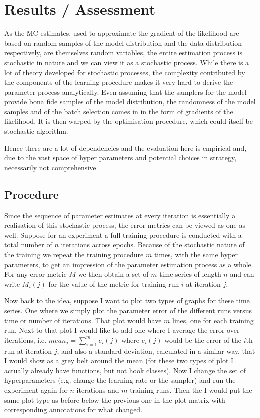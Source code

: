 
\section{Results / Assessment}

As the MC estimates, used to approximate the gradient of the likelihood are based on random samples of the model distribution and the data distribution respectively,
are themselves random variables, the entire estimation process is stochastic in nature and we can view it as a stochastic process.
While there is a lot of theory developed for stochastic processes, 
the complexity contributed by the components of the learning procedure makes it very hard to derive the parameter process analytically.
Even assuming that the samplers for the model provide bona fide samples of the model distribution, 
the randomness of the model samples and of the batch selection comes in in the form of gradients of the likelihood.
It is then warped by the optimisation procedure, which could itself be stochastic algorithm.

Hence there are a lot of dependencies and the evaluation here is empirical and, due to the vast space of hyper parameters and potential choices in strategy,
necessarily not comprehensive.


\subsection{Procedure}

Since the sequence of parameter estimates at every iteration is essentially a realisation of this stochastic process, the error metrics can be viewed as one as well.
Suppose for an experiment a full training procedure is conducted with a total number of $n$ iterations across epochs.
Because of the stochastic nature of the training we repeat the training procedure $m$ times, with the same hyper parameters, 
to get an impression of the parameter estimation process as a whole.
For any error metric $M$ we then obtain a set of $m$ time series of length $n$ and can write $M_i (j)$ for the value of the metric for training run $i$ at iteration $j$.

Now back to the idea, suppose I want to plot two types of graphs for these time series. One where we simply plot the parameter error of the different runs versus time or number of iterations. That plot would have $m$ lines, one for each training run. Next to that plot I would like to add one where I average the error over iterations, i.e. $mean_j = \sum_{i = 1}^m e_i(j)$ where $e_i(j)$ would be the error of the $i$th run at iteration $j$, and also a standard deviation, calculated in a similar way, that I would show as a grey belt around the mean (for these two types of plot I actually already have functions, but not hook classes). Now I change the set of hyperparameters (e.g. change the learning rate or the sampler) and run the experiment again for $n$ iterations and $m$ training runs. Then the I would put the same plot type as before below the previous one in the plot matrix with corresponding annotations for what changed.